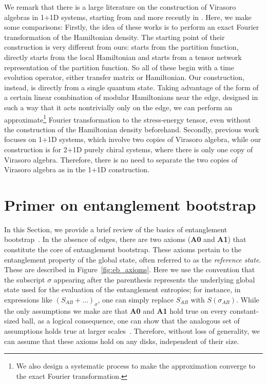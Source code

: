 \documentclass[12pt, nofootinbib]{article}
\theoremstyle{plain}
\theoremstyle{assumption}
\theoremstyle{definition}
\theoremstyle{plain}
\theoremstyle{plain}
\theoremstyle{plain}
\theoremstyle{plain}
\theoremstyle{plain}
\begin{document}
We remark that there is a large literature on the construction of Virasoro algebras in 1+1D systems, starting from \cite{Koo:1993wz} and more recently in \cite{Hu:2020suv,Osborne:2021ppp,Wang:2022qxf,Zeng:2022swq}. Here, we make some comparisons: Firstly, the idea of these works is to perform an exact Fourier transformation of the Hamiltonian density. The starting point of their construction is very different from ours: \cite{Koo:1993wz} starts from the partition function, \cite{Hu:2020suv} directly starts from the local Hamiltonian and \cite{Wang:2022qxf,Zeng:2022swq} starts from a tensor network representation of the partition function. So all of these begin with a time evolution operator, either transfer matrix or Hamiltonian.  Our construction, instead, is directly from a single quantum state. Taking advantage of the form of a certain linear combination of modular Hamiltonians near the edge, designed in such a way that it acts nontrivially only on the edge, we can perform an approximate\footnote{We also design a systematic process to make the approximation converge to the exact Fourier transformation.} Fourier transformation to the stress-energy tensor, even without the construction of the Hamiltonian density beforehand. Secondly, previous work focuses on 1+1D systems, which involve two copies of Virasoro algebra, while our construction is for 2+1D purely chiral systems, where there is only one copy of Virasoro algebra. Therefore, there is no need to separate the two copies of Virasoro algebra as in the 1+1D construction. 



\section{Primer on entanglement bootstrap}
\label{sec:primer_eb}

In this Section, we provide a brief review of the basics of entanglement bootstrap~\cite{shi2020fusion}. In the absence of edges, there are two axioms (\textbf{A0} and \textbf{A1}) that constitute the core of entanglement bootstrap. These axioms pertain to the entanglement property of the global state, often referred to as the \emph{reference state}. These are described in Figure~\ref{fig:eb_axioms}. Here we use the convention that the subscript $\sigma$ appearing after the parenthesis represents the underlying global state used for the evaluation of the entanglement entropies; for instance, in expressions like $(S_{AB} + \ldots)_{\sigma}$, one can simply replace $S_{AB}$ with $S(\sigma_{AB})$. While the only assumptions we make are that \textbf{A0} and \textbf{A1} hold true on every constant-sized ball, as a logical consequence, one can show that the analogous set of assumptions holds true at larger scales~\cite{shi2020fusion}. Therefore, without loss of generality, we can assume that these axioms hold on any disks, independent of their size.
\end{document}
